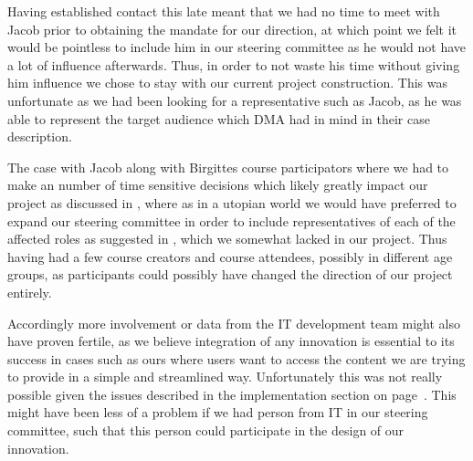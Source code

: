 Having established contact this late meant that we had no time to meet with Jacob prior to obtaining the mandate for our direction, at which point we felt it would be pointless to include him in our steering committee as he would not have a lot of influence afterwards. Thus, in order to not waste his time without giving him influence we chose to stay with our current project construction. This was unfortunate as we had been looking for a representative such as Jacob, as he was able to represent the target audience which DMA had in mind in their case description.

The case with Jacob along with Birgittes course participators where we had to make an number of time sensitive decisions which likely greatly impact our project as discussed in \cite{key-to-success-p1}, where as in a utopian world we would have preferred to expand our steering committee in order to include representatives of each of the affected roles as suggested in \cite{callon}, which we somewhat lacked in our project. Thus having had a few course creators and course attendees, possibly in different age groups, as participants could possibly have changed the direction of our project entirely.

Accordingly more involvement or data from the IT development team might also have proven fertile, as we believe integration of any innovation is essential to its success in cases such as ours where users want to access the content we are trying to provide in a simple and streamlined way. Unfortunately this was not really possible given the issues described in the implementation section on page~\pageref{sec:implementation}. This might have been less of a problem if we had person from IT in our steering committee, such that this person could participate in the design of our innovation.
